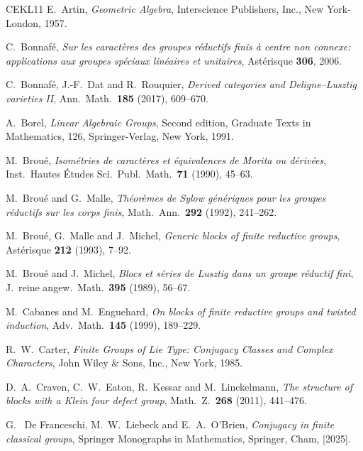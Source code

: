 \documentclass[12pt]{amsart}
\theoremstyle{theorem}
\theoremstyle{definition}
\theoremstyle{remark}
\begin{document}
\begin{thebibliography}{CEKL11}
 E.~Artin, \emph{Geometric Algebra}, Interscience 
        Publishers, Inc., New York-London, 1957.


 C.~Bonnaf{\'e}, \emph{Sur les caract\`eres des groupes 
	r\'eductifs finis \`a centre non connexe: applications aux groupes 
	sp\'eciaux lin\'eaires et unitaires}, {Ast\'erisque} {\bf 306}, 2006.

 C.~Bonnaf{\'e}, J.-F.~Dat and R.~Rouquier, \emph{Derived
        categories and Deligne--Lusztig varieties II}, Ann.\ Math.\ \textbf{185} 
        (2017),  609--670.

 A.~Borel, \emph{Linear Algebraic Groups}, Second edition, 
        Graduate Texts in Mathematics, 126, Springer-Verlag, New York, 1991.

 M.~Brou{\'e}, \emph{Isom\'etries de caract\`eres et 
        {\'e}quivalences de Morita ou d\'eriv\'ees}, Inst.\ Hautes {\'E}tudes 
        Sci.\ Publ.\ Math.\ \textbf{71} (1990), 45--63.

 M.~Brou{\'e} and G.~Malle, \emph{Th{\'e}or{\`e}mes de 
        {S}ylow g{\'e}n{\'e}riques pour les groupes r{\'e}ductifs sur les corps 
        finis}, Math.\ Ann.\ \textbf{292} (1992), 241--262.

 M.~Brou\'e, G.~Malle and J.~Michel, \emph{Generic 
        blocks of finite reductive groups}, Ast\'erisque \textbf{212} (1993), 
        7--92.

 M.~Brou\'e and J.~Michel, \emph{Blocs et s\'eries de 
        Lusztig dans un groupe r\'eductif fini}, J.~reine angew.\ Math.\ 
        \textbf{395} (1989), 56--67.

 M.~Cabanes and M.~Enguehard, \emph{On blocks of finite 
        reductive groups and twisted induction}, Adv.\ Math.\ \textbf{145} 
        (1999), 189--229.

 R.~W.~Carter, \emph{Finite Groups of Lie Type: Conjugacy 
        Classes and Complex Characters}, John Wiley \& Sons, Inc., New York, 
        1985.

 D.~A.~Craven, C.~W.~Eaton, R.~Kessar and M.~Linckelmann, 
        \emph{The structure of blocks with a Klein four defect group}, Math.~Z.\
        \textbf{268} (2011), 441--476. 


 G.~ De Franceschi, M.~W.~Liebeck and E.~A.~O'Brien, 
        \emph{Conjugacy in finite classical groups}, Springer Monographs in 
        Mathematics, Springer, Cham, [2025]. 


\end{thebibliography}
\end{document}
